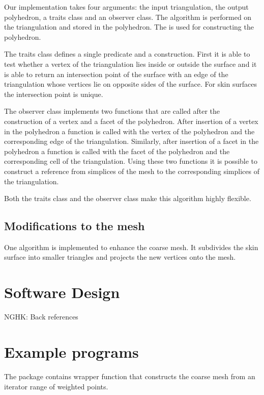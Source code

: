 Our implementation takes four arguments: the input triangulation, the
output polyhedron, a traits class and an observer class.  The
algorithm is performed on the triangulation and stored in the
polyhedron. The  is used for
constructing the polyhedron.

The traits class defines a single predicate and a construction. First
it is able to test whether a vertex of the triangulation lies inside
or outside the surface and it is able to return an intersection point
of the surface with an edge of the triangulation whose vertices lie on
opposite sides of the surface. For skin surfaces the intersection
point is unique.

The observer class implements two functions that are called after the
construction of a vertex and a facet of the polyhedron. After
insertion of a vertex in the polyhedron a function is called with the
vertex of the polyhedron and the corresponding edge of the
triangulation. Similarly, after insertion of a facet in the polyhedron
a function is called with the facet of the polyhedron and the
corresponding cell of the triangulation. Using these two functions it
is possible to construct a reference from simplices of the mesh to the
corresponding simplices of the triangulation.

Both the traits class and the observer class make this algorithm highly
flexible.
\subsection{Modifications to the mesh}
One algorithm is implemented to enhance the coarse mesh. It subdivides
the skin surface into smaller triangles and projects the new vertices
onto the mesh.
\section{Software Design}
NGHK: Back references
\section{Example programs}
The package contains wrapper function that constructs the coarse mesh
from an iterator range of weighted points.



